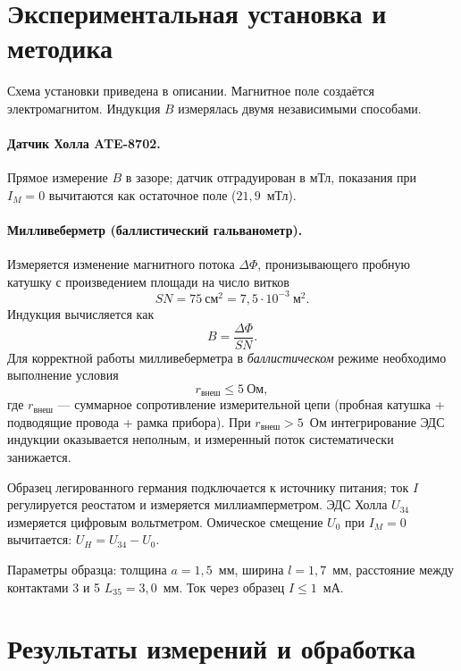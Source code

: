 \documentclass[a4paper,12pt]{article}
\begin{document}
\section{Экспериментальная установка и методика}
Схема установки приведена в описании. Магнитное поле создаётся электромагнитом. Индукция \(B\) измерялась двумя независимыми способами.

\paragraph{Датчик Холла ATE-8702.} Прямое измерение \(B\) в зазоре; датчик отградуирован в мТл, показания при \(I_M = 0\) вычитаются как остаточное поле (\(21{,}9\)~мТл).

\paragraph{Милливеберметр (баллистический гальванометр).} Измеряется изменение магнитного потока \(\Delta\Phi\), пронизывающего пробную катушку с произведением площади на число витков
\[
    SN = 75~\text{см}^2 = 7{,}5\cdot10^{-3}~\text{м}^2.
\]
Индукция вычисляется как
\begin{equation}
    B = \frac{\Delta\Phi}{SN}.
    \label{eq:web}
\end{equation}
Для корректной работы милливеберметра в \emph{баллистическом} режиме необходимо выполнение условия
\begin{equation}
    r_{\text{внеш}} \le 5~\text{Ом},
    \label{eq:r}
\end{equation}
где \(r_{\text{внеш}}\) --- суммарное сопротивление измерительной цепи (пробная катушка + подводящие провода + рамка прибора). При \(r_{\text{внеш}} > 5\)~Ом интегрирование ЭДС индукции оказывается неполным, и измеренный поток систематически занижается.

Образец легированного германия подключается к источнику питания; ток \(I\) регулируется реостатом и измеряется миллиамперметром. ЭДС Холла \(U_{34}\) измеряется цифровым вольтметром. Омическое смещение \(U_0\) при \(I_M = 0\) вычитается: \(U_H = U_{34} - U_0\).

Параметры образца: толщина \(a = 1{,}5\)~мм, ширина \(l = 1{,}7\)~мм, расстояние между контактами 3 и 5 \(L_{35} = 3{,}0\)~мм. Ток через образец \(I \le 1\)~мА.

\section{Результаты измерений и обработка}
\end{document}
